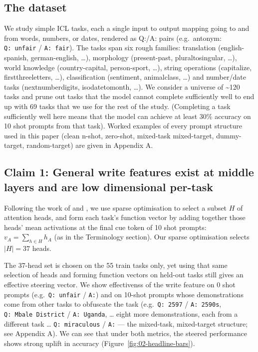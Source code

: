 \documentclass{article}
\renewcommand{\_}{\textunderscore\allowbreak}
\begin{document}
\subsection{The dataset}\label{the-dataset}

We study simple ICL tasks, each a single input to output mapping going to and from words, numbers, or dates, rendered as Q:/A: pairs (e.g.~antonym: \texttt{Q:\ unfair} / \texttt{A:\ fair}). The tasks span six rough families: translation (english-spanish, german-english, \ldots), morphology (present-past, plural\_to\_singular, \ldots), world knowledge (country-capital, person-sport, \ldots), string operations (capitalize, first\_three\_letters, \ldots), classification (sentiment, animal\_class, \ldots) and number/date tasks (next\_number\_digits, iso\_date\_to\_month, \ldots). We consider a universe of \textasciitilde120 tasks and prune out tasks that the model cannot complete sufficiently well to end up with 69 tasks that we use for the rest of the study. (Completing a task sufficiently well here means that the model can achieve at least 30\% accuracy on 10 shot prompts from that task). Worked examples of every prompt structure used in this paper (clean n-shot, zero-shot, mixed-task mixed-target, dummy-target, random-target) are given in Appendix A.

\subsection{Claim 1: General write features exist at middle layers and are low dimensional per-task}\label{claim-1-general-write-features-exist-at-middle-layers-and-are-low-dimensional-per-task}

Following the work of \citet{todd2024function} and \citet{hu2025addition}, we use sparse optimisation to select a subset \(H\) of attention heads, and form each task's function vector by adding together those heads' mean activations at the final cue token of 10 shot prompts: \(v_A = \sum_{h \in H} h_A\) (as in the Terminology section). Our sparse optimisation selects \(|H| = 37\) heads.

The 37-head set is chosen on the 55 train tasks only, yet using that same selection of heads and forming function vectors on held-out tasks still gives an effective steering vector. We show effectivenss of the write feature on 0 shot prompts (e.g.~\texttt{Q:\ unfair} / \texttt{A:}) and on 10-shot prompts whose demonstrations come from other tasks to obfuscate the task (e.g.~\texttt{Q:\ 2597} / \texttt{A:\ 2590s}, \texttt{Q:\ Mbale\ District} / \texttt{A:\ Uganda}, \ldots{} eight more demonstrations, each from a different task \ldots{} \texttt{Q:\ miraculous} / \texttt{A:} --- the mixed-task, mixed-target structure; see Appendix A). We can see that under both metrics, the steered performance shows strong uplift in accuracy (Figure~\ref{fig:02-headline-bars}).
\end{document}
